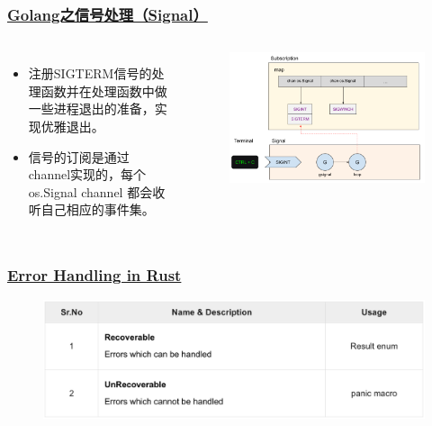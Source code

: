 \begin{frame}[fragile]
    \frametitle{\href{https://zhuanlan.zhihu.com/p/128953024}{Golang之信号处理（Signal）}}

    \begin{columns}[c] %

        \begin{itemize}
            \item 注册SIGTERM信号的处理函数并在处理函数中做一些进程退出的准备，实现优雅退出。
            \item 信号的订阅是通过 channel实现的，每个os.Signal channel 都会收听自己相应的事件集。
        \end{itemize}

        \begin{figure}
        \includegraphics[width=1.0\linewidth]{figs/GO-signal.png}
        \end{figure}

    \end{columns}

\end{frame}
\begin{frame}[fragile]
    \frametitle{\href{https://www.tutorialspoint.com/rust/rust_error_handling.htm}{Error Handling in Rust}}

    \begin{figure}
    \includegraphics[width=1.0\linewidth]{figs/rust-error-handling.png}
    \end{figure}

\end{frame}


